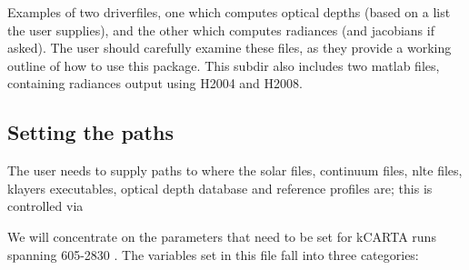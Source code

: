 \documentclass[11pt]{article}
\begin{document}
Examples of two driverfiles, one which computes optical depths (based on
a list the user supplies), and the other which computes radiances (and
jacobians if asked). The user should carefully examine these files, as
they provide a working outline of how to use this package. This subdir
also includes two matlab files, containing radiances output using H2004
and H2008.

\subsection{Setting the paths}
\label{sec-3-1}

The user needs to supply paths to where the solar files, continuum
files, nlte files, klayers executables, optical depth database and
reference profiles are; this is controlled via

We will concentrate on the parameters that need to be set for kCARTA
runs spanning 605-2830 . The variables set in this file fall into three
categories:
\end{document}
